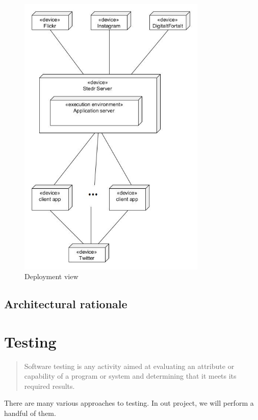 \documentclass[11pt]{book}
\begin{document}
\begin{figure}[H]
      \centering
      \includegraphics[width=0.8\textwidth]{Figures/Architecture/deploymentView.jpg}
      \caption{Deployment view}
      \label{fig:arch_deployment}
\end{figure}

\section{Architectural rationale}


\chapter{Testing}

\begin{quotation}\noindent
Software testing is any activity aimed at evaluating an attribute or capability of a program or system and determining that it meets its required results. \cite{pan}
\end{quotation}

There are many various approaches to testing. In out project, we will perform a handful of them.
\end{document}
